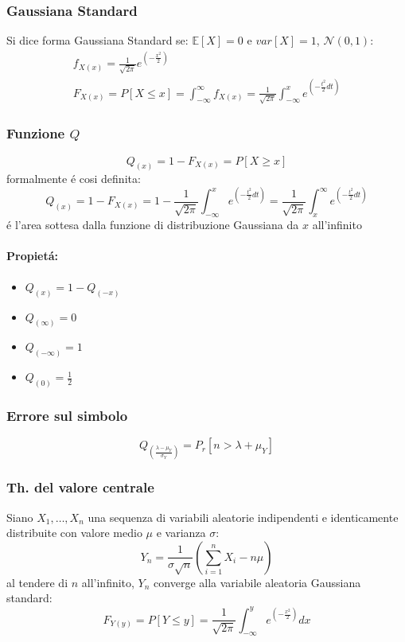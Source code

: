         \subsubsection{Gaussiana Standard}
            Si dice forma Gaussiana Standard se: $\mathbb{E}[X] = 0$ e $var[X] = 1$, $\mathcal{N}(0,1)$:
            \begin{gather}
                f_{X(x)} = \frac{1}{\sqrt{2\pi}} e^{\displaystyle\left(-\frac{x^2}{2}\right)}\nonumber \\
                F_{X(x)} =P[X\leq x] = \int_{-\infty}^{\infty}f_{X(x)} =\frac{1}{\sqrt{2\pi}} \int_{-\infty}^{x}e^{\displaystyle\left(-\frac{t^2}{2}dt\right)}\nonumber 
            \end{gather}
        \subsubsection{Funzione $Q$}
            \[
                Q_{(x)} = 1-F_{X(x)} = P[X\geq x]  
            \]
            formalmente é cosi definita:
            \[
                Q_{(x)} = 1-F_{X(x)} = 1 - \frac{1}{\sqrt{2\pi}} \int_{-\infty}^{x}e^{\left(-\frac{t^2}{2}dt\right)} = \frac{1}{\sqrt{2\pi}} \int_{x}^{\infty}e^{\left(-\frac{t^2}{2}dt\right)}  
            \]
            é l'area sottesa dalla funzione di distribuzione Gaussiana da $x$ all'infinito
            \paragraph{Propietá:}
            \begin{itemize}
                \item {$Q_{(x)} = 1-Q_{(-x)}$
                }
                \item {$Q_{(\infty)} = 0$}
                \item {$Q_{(-\infty)} = 1$}
                \item {$Q_{(0)} = \frac{1}{2}$}
            \end{itemize}
            \subsubsection{Errore sul simbolo}
                \[
                    Q_{\displaystyle\left(\frac{\lambda -\mu_Y}{\sigma_Y}\right)} = P_r[n>\lambda + \mu_Y]
                \]
        \subsubsection{Th. del valore centrale}
            Siano $X_1,\dots,X_n$ una sequenza di variabili aleatorie indipendenti e identicamente distribuite con valore medio $\mu$ e varianza $\sigma$:
            \[
                Y_n = \frac{1}{\sigma\sqrt{n}}\left(\sum_{i=1}^{n}X_i-n\mu\right)    
            \]
            al tendere di $n$ all'infinito, $Y_n$ converge alla variabile aleatoria Gaussiana standard:
            \[
                F_{Y(y)} =P[Y\leq y] = \frac{1}{\sqrt{2\pi}} \int_{-\infty}^{y}e^{\left(-\frac{x^2}{2}\right)}dx    
            \]
